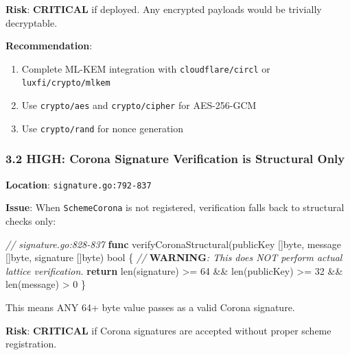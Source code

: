 \documentclass[
]{article}
\newenvironment{Shaded}{}{}
\newcommand{\AlertTok}[1]{\textcolor[rgb]{1.00,0.00,0.00}{\textbf{#1}}}
\newcommand{\BuiltInTok}[1]{\textcolor[rgb]{0.00,0.50,0.00}{#1}}
\newcommand{\CommentTok}[1]{\textcolor[rgb]{0.38,0.63,0.69}{\textit{#1}}}
\newcommand{\ControlFlowTok}[1]{\textcolor[rgb]{0.00,0.44,0.13}{\textbf{#1}}}
\newcommand{\DataTypeTok}[1]{\textcolor[rgb]{0.56,0.13,0.00}{#1}}
\newcommand{\DecValTok}[1]{\textcolor[rgb]{0.25,0.63,0.44}{#1}}
\newcommand{\KeywordTok}[1]{\textcolor[rgb]{0.00,0.44,0.13}{\textbf{#1}}}
\newcommand{\NormalTok}[1]{#1}
\newcommand{\OperatorTok}[1]{\textcolor[rgb]{0.40,0.40,0.40}{#1}}
\providecommand{\tightlist}{%
  \setlength{\itemsep}{0pt}\setlength{\parskip}{0pt}}
\begin{document}
\textbf{Risk}: \textbf{CRITICAL} if deployed. Any encrypted payloads
would be trivially decryptable.

\textbf{Recommendation}:

\begin{enumerate}
\def\labelenumi{\arabic{enumi}.}
\tightlist
\item
  Complete ML-KEM integration with \texttt{cloudflare/circl} or
  \texttt{luxfi/crypto/mlkem}
\item
  Use \texttt{crypto/aes} and \texttt{crypto/cipher} for AES-256-GCM
\item
  Use \texttt{crypto/rand} for nonce generation
\end{enumerate}

\subsubsection{3.2 HIGH: Corona Signature Verification is Structural
Only}\label{32-high-corona-signature-verification-is-structural-only}

\textbf{Location}: \texttt{signature.go:792-837}

\textbf{Issue}: When \texttt{SchemeCorona} is not registered,
verification falls back to structural checks only:

\begin{Shaded}
\begin{Highlighting}[]
\CommentTok{// signature.go:828{-}837}
\KeywordTok{func}\NormalTok{ verifyCoronaStructural}\OperatorTok{(}\NormalTok{publicKey }\OperatorTok{[]}\DataTypeTok{byte}\OperatorTok{,}\NormalTok{ message }\OperatorTok{[]}\DataTypeTok{byte}\OperatorTok{,}\NormalTok{ signature }\OperatorTok{[]}\DataTypeTok{byte}\OperatorTok{)} \DataTypeTok{bool} \OperatorTok{\{}
    \CommentTok{// }\AlertTok{WARNING}\CommentTok{: This does NOT perform actual lattice verification.}
    \ControlFlowTok{return} \BuiltInTok{len}\OperatorTok{(}\NormalTok{signature}\OperatorTok{)} \OperatorTok{\textgreater{}=} \DecValTok{64} \OperatorTok{\&\&} \BuiltInTok{len}\OperatorTok{(}\NormalTok{publicKey}\OperatorTok{)} \OperatorTok{\textgreater{}=} \DecValTok{32} \OperatorTok{\&\&} \BuiltInTok{len}\OperatorTok{(}\NormalTok{message}\OperatorTok{)} \OperatorTok{\textgreater{}} \DecValTok{0}
\OperatorTok{\}}
\end{Highlighting}
\end{Shaded}

This means ANY 64+ byte value passes as a valid Corona signature.

\textbf{Risk}: \textbf{CRITICAL} if Corona signatures are accepted
without proper scheme registration.
\end{document}
